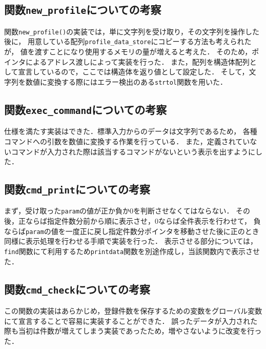 \documentclass[a4j,11pt]{jarticle}
\begin{document}
\subsection{関数\texttt{new\_profile}についての考察}
関数\verb|new_profile()|の実装では，単に文字列を受け取り，その文字列を操作した後に，
用意している配列\verb|profile_data_store|にコピーする方法も考えられたが，
値を渡すことになり使用するメモリの量が増えると考えた．
そのため，ポインタによるアドレス渡しによって実装を行った．
また，配列を構造体配列として宣言しているので，ここでは構造体を返り値として設定した．
そして，文字列を数値に変換する際にはエラー検出のある\verb|strtol|関数を用いた．
\subsection{関数\texttt{exec\_command}についての考察}
仕様を満たす実装はできた．標準入力からのデータは文字列であるため，
各種コマンドへの引数を数値に変換する作業を行っている．
また，定義されていないコマンドが入力された際は該当するコマンドがないという表示を出すようにした．

\subsection{関数\texttt{cmd\_print}についての考察}
まず，受け取った\verb|param|の値が正か負か$0$を判断させなくてはならない．
その後，正ならば指定件数分前から順に表示させ，$0$ならば全件表示を行わせて，
負ならば\verb|param|の値を一度正に戻し指定件数分ポインタを移動させた後に正のとき同様に表示処理を行わせる手順で実装を行った．
表示させる部分については，\verb|find|関数にて利用するため\verb|printdata|関数を別途作成し，当該関数内で表示させた．
\subsection{関数\texttt{cmd\_check}についての考察}
この関数の実装はあらかじめ，登録件数を保存するための変数をグローバル変数にて宣言することで容易に実装することができた．
誤ったデータが入力された際も当初は件数が増えてしまう実装であったため，増やさないように改変を行った．
\end{document}
